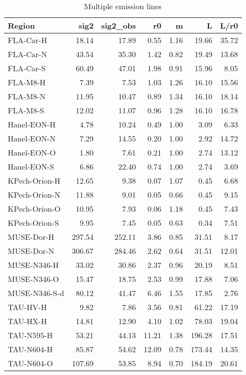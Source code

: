 \begin{table}
\centering
\caption{Multiple emission lines}
\label{tab:preresults}
\begin{tabular}{lrrrrrr}
\toprule
        Region &    sig2 &  sig2_obs &     r0 &     m &       L &   L/r0 \\
\midrule
     FLA-Car-H &   18.14 &     17.89 &   0.55 &  1.16 &   19.66 &  35.72 \\
     FLA-Car-N &   43.54 &     35.30 &   1.42 &  0.82 &   19.49 &  13.68 \\
     FLA-Car-S &   60.49 &     47.01 &   1.98 &  0.91 &   15.96 &   8.05 \\
      FLA-M8-H &    7.39 &      7.53 &   1.03 &  1.26 &   16.10 &  15.56 \\
      FLA-M8-N &   11.95 &     10.47 &   0.89 &  1.34 &   16.10 &  18.14 \\
      FLA-M8-S &   12.02 &     11.07 &   0.96 &  1.28 &   16.10 &  16.78 \\
   Hanel-EON-H &    4.78 &     10.24 &   0.49 &  1.00 &    3.09 &   6.33 \\
   Hanel-EON-N &    7.29 &     14.55 &   0.20 &  1.00 &    2.92 &  14.72 \\
   Hanel-EON-O &    1.80 &      7.61 &   0.21 &  1.00 &    2.74 &  13.12 \\
   Hanel-EON-S &    6.86 &     22.40 &   0.74 &  1.00 &    2.74 &   3.69 \\
 KPech-Orion-H &   12.65 &      9.38 &   0.07 &  1.07 &    0.45 &   6.68 \\
 KPech-Orion-N &   11.88 &      9.01 &   0.05 &  0.66 &    0.45 &   9.15 \\
 KPech-Orion-O &   10.95 &      7.93 &   0.06 &  1.18 &    0.45 &   7.43 \\
 KPech-Orion-S &    9.95 &      7.45 &   0.05 &  0.63 &    0.34 &   7.51 \\
    MUSE-Dor-H &  297.54 &    252.11 &   3.86 &  0.85 &   31.51 &   8.17 \\
    MUSE-Dor-N &  306.67 &    284.46 &   2.62 &  0.64 &   31.51 &  12.01 \\
   MUSE-N346-H &   33.02 &     30.86 &   2.37 &  0.96 &   20.19 &   8.51 \\
   MUSE-N346-O &   15.47 &     18.75 &   2.53 &  0.99 &   17.88 &   7.06 \\
 MUSE-N346-S-d &   80.12 &     41.47 &   6.46 &  1.55 &   17.85 &   2.76 \\
      TAU-HV-H &    9.82 &      7.86 &   3.56 &  0.81 &   61.22 &  17.19 \\
      TAU-HX-H &   14.81 &     12.90 &   4.10 &  1.02 &   78.03 &  19.04 \\
    TAU-N595-H &   53.21 &     44.13 &  11.21 &  1.38 &  196.28 &  17.51 \\
    TAU-N604-H &   85.87 &     54.62 &  12.09 &  0.78 &  173.44 &  14.35 \\
    TAU-N604-O &  107.69 &     53.85 &   8.94 &  0.70 &  184.19 &  20.61 \\
\bottomrule
\end{tabular}
\end{table}
